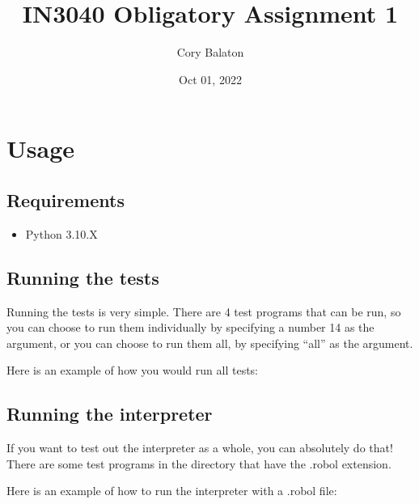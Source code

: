 \documentclass[letterpaper,10pt,english]{sphinxmanual}
\title{IN3040 Obligatory Assignment 1}
\date{Oct 01, 2022}
\author{Cory Balaton}
\begin{document}
\pagestyle{empty}
\sphinxmaketitle
\pagestyle{plain}
\sphinxtableofcontents
\pagestyle{normal}
\label{\detokenize{index::doc}}



\chapter{Usage}
\label{\detokenize{usage:usage}}\label{\detokenize{usage::doc}}

\section{Requirements}
\label{\detokenize{usage:requirements}}\begin{itemize}
\item {} 
\sphinxAtStartPar
Python 3.10.X

\end{itemize}


\section{Running the tests}
\label{\detokenize{usage:running-the-tests}}
\sphinxAtStartPar
Running the tests is very simple. There are 4 test programs that can be run, so you can choose to run them individually by specifying a number 1\sphinxhyphen{}4 as the argument, or you can choose to run them all, by specifying “all” as the argument.

\sphinxAtStartPar
Here is an example of how you would run all tests:

\begin{sphinxVerbatim}[commandchars=\\\{\}]
  
\end{sphinxVerbatim}


\section{Running the interpreter}
\label{\detokenize{usage:running-the-interpreter}}
\sphinxAtStartPar
If you want to test out the interpreter as a whole, you can absolutely do that!
There are some test programs in the  directory that have the .robol extension.

\sphinxAtStartPar
Here is an example of how to run the interpreter with a .robol file:

\begin{sphinxVerbatim}[commandchars=\\\{\}]
 
\end{sphinxVerbatim}
\end{document}
